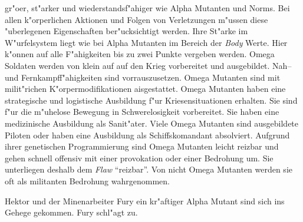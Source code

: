 \begin{description}
        gr"o\3er, st"arker und wiederstandsf"ahiger wie Alpha Mutanten und Norms. Bei allen k"orperlichen Aktionen und Folgen von Verletzungen m"ussen diese "uberlegenen Eigenschaften ber"ucksichtigt werden. Ihre St"arke im W"urfelsystem liegt wie bei Alpha Mutanten im Bereich der \emph{Body} Werte. Hier k"onnen auf alle F"ahigkeiten bis zu zwei Punkte vergeben werden. Omega Soldaten werden von klein auf auf den Krieg vorbereitet und ausgebildet. Nah-- und Fernkampff"ahigkeiten sind vorrauszusetzen. Omega Mutanten sind mit milit"richen K"orpermodifikationen aisgestattet. Omega Mutanten haben eine strategische und logistische Ausbildung f"ur Kriesensituationen erhalten. Sie sind f"ur die m"uhelose Bewegung in Schwerelosigkeit vorbereitet. Sie haben eine medizinische Ausbildung als Sanit"ater. Viele Omega Mutanten sind ausgebildete Piloten oder haben eine Ausbildung als Schiffskomandant absolviert. Aufgrund ihrer genetischen Programmierung sind Omega Mutanten leicht reizbar und gehen schnell offensiv mit einer provokation oder einer Bedrohung um. Sie unterliegen deshalb dem \emph{Flaw} "`reizbar"'. Von nicht Omega Mutanten werden sie oft als militanten Bedrohung wahrgenommen.
\end{description}


\begin{remarks}
    Hektor und der Minenarbeiter Fury ein kr"aftiger Alpha Mutant sind sich ins Gehege gekommen. Fury schl"agt zu.

\end{remarks}


